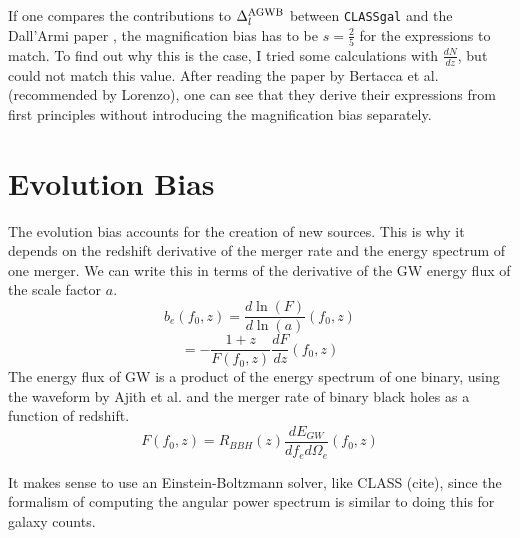 If one compares the contributions to $\Delta_l^{\rm{AGWB}}$ between {\tt CLASSgal} and the Dall'Armi paper \cite{dallarmi_dipole_2022}, the magnification bias has to be  $s=\frac{2}{5}$ for the expressions to match. To find out why this is the case, I tried some calculations with $\frac{dN}{dz}$, but could not match this value.  After reading the paper by Bertacca et al. \cite{bertacca_projection_2020} (recommended by Lorenzo), one can see that they derive their expressions from 
first principles without introducing the magnification bias separately. 

\section{Evolution Bias}
\label{evo_bias_section}
The evolution bias accounts for the creation of new sources. This is why it depends on the redshift derivative of the merger rate and the energy spectrum of one merger. We can write this in terms of the derivative of the GW energy flux of the scale factor $a$.
\begin{equation}
    b_e(f_0, z) = \frac{d\ln(F)}{d\ln(a)}(f_0, z)
\end{equation}
\begin{equation}
    = -\frac{1+z}{F(f_0, z)}\frac{dF}{dz}(f_0, z)
\end{equation}
The energy flux of GW is a product of the energy spectrum of one binary, using the waveform by Ajith et al. \cite{ajith_inspiral-merger-ringdown_2011} and the merger rate of binary black holes as a function of redshift.
\begin{equation}
    F(f_0, z) = R_{BBH}(z) \frac{d E_{GW}}{df_e d\Omega_e}(f_0, z)
\end{equation}

It makes sense to use an Einstein-Boltzmann solver, like CLASS (cite), since the formalism of computing the angular power spectrum is similar to doing this for galaxy counts.
